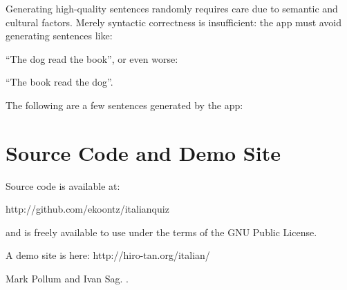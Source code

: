 \documentclass[11pt]{article}
\begin{document}
Generating high-quality sentences randomly requires care due to
semantic and cultural factors. Merely syntactic correctness is
insufficient: the app must avoid generating sentences like:

``The dog read the book'', or even worse:

``The book read the dog''. 

The following are a few sentences generated by the app:


\section{Source Code and Demo Site}

Source code is available at:

http://github.com/ekoontz/italianquiz

and is freely available to use under the terms of the GNU Public
License.

A demo site is here: http://hiro-tan.org/italian/

\begin{thebibliography}{}

Mark Pollum and Ivan Sag.
.

\end{thebibliography}
\end{document}

